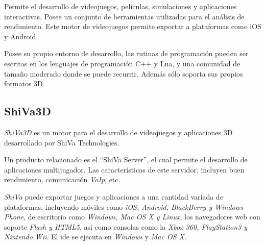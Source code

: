 Permite el desarrollo de videojuegos, películas, simulaciones 
y aplicaciones interactivas. Posee un conjunto de herramientas utilizadas para el 
análisis de rendimiento. Este motor de videojuegos permite exportar a plataformas 
como iOS y Android\cite{cryengine}.

Posee su propio entorno de desarrollo, las rutinas de programación pueden ser 
escritas en los lenguajes de programación C++ y Lua, y una comunidad de 
tamaño moderado donde se puede recurrir. Además sólo soporta sus propios formatos 
3D\cite{cryengine}.






\subsection{ShiVa3D}

\textit{ShiVa3D} es un motor para el desarrollo de videojuegos y aplicaciones 
3D desarrollado por ShiVa Technologies\cite{shiva}.

Un producto relacionado es el \enquote{ShiVa Server}, el cual permite el
desarrollo de aplicaciones multijugador. Las características de este servidor,
incluyen buen rendimiento, comunicación \textit{VoIp}, etc\cite{shiva}.

\textit{ShiVa} puede exportar juegos y aplicaciones a una cantidad variada de 
plataformas, incluyendo móviles como \textit{iOS, Android, BlackBerry y Windows
Phone}, de escritorio como \textit{Windows, Mac OS X y Linux}, los
navegadores web con soporte \textit{Flash y HTML5}, así como consolas como la
\textit{Xbox 360, PlayStation3 y Nintendo Wii}. El \Gls{ide} se ejecuta en
\textit{Windows} y \textit{Mac OS X}\cite{shiva}. 

